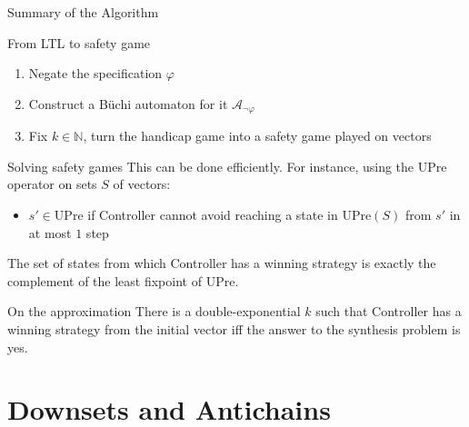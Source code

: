 \documentclass[aspectratio=169]{beamer}
\begin{document}
\begin{frame}{Summary of the Algorithm}
  \begin{block}{From LTL to safety game}
    \begin{enumerate}
      \item Negate the specification $\varphi$
      \item Construct a B\"uchi automaton for it $\mathcal{A}_{\lnot \varphi}$
      \item Fix $k \in \mathbb{N}$, turn the handicap game into a
        \alert{safety game} played on vectors
    \end{enumerate}
  \end{block}
  \pause
  \begin{block}{Solving safety games}
    This can be done efficiently. For instance, using the \alert{UPre}
    operator on sets $S$ of vectors: 
    \begin{itemize}
      \item $s' \in \mathrm{UPre}$ if Controller cannot avoid
        reaching a state in $\mathrm{UPre}(S)$ from $s'$ in at most $1$ step
    \end{itemize}
    The set of states from which Controller has a winning strategy is exactly
    the \alert{complement} of the least fixpoint of UPre. 
  \end{block}
  \pause
  \begin{block}{On the approximation}
    There is a double-exponential $k$ such that Controller has a winning
    strategy from the initial vector iff the answer to the synthesis problem
    is \alert{yes}.
  \end{block}
\end{frame}

\section{Downsets and Antichains}
\end{document}
